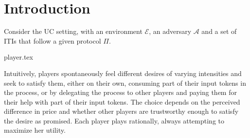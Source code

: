 \section{Introduction}
  Consider the UC setting, with an environment $\mathcal{E}$, an adversary $\mathcal{A}$
  and a set of ITIs that follow a given protocol $\Pi$.

  {player.tex}

  Intuitively, players spontaneously feel different desires of varying intensities and
  seek to satisfy them, either on their own, consuming part of their input tokens in the
  process, or by delegating the process to other players and paying them for their help
  with part of their input tokens. The choice depends on the perceived difference in
  price and whether other players are trustworthy enough to satisfy the desire
  as promised. Each player plays rationally, always attempting to maximize her
  utility.
